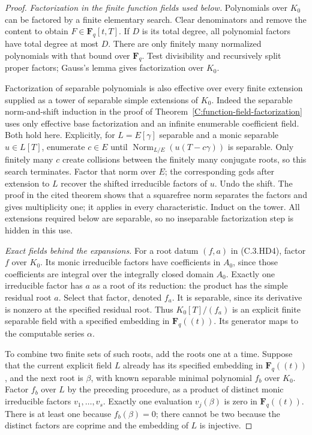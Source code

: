 \begin{proof}
\emph{Factorization in the finite function fields used below.}
Polynomials over $K_0$ can be factored by a finite
elementary search.  Clear denominators and remove the
content to obtain $F\in\mathbf F_q[t,T]$.
If $D$ is its total degree, all polynomial factors have
total degree at most $D$.  There are only finitely many
normalized polynomials with that bound over $\mathbf F_q$.
Test divisibility and recursively split proper factors;
Gauss's lemma gives factorization over $K_0$.

Factorization of separable polynomials is also effective
over every finite extension supplied as a tower of
separable simple extensions of $K_0$.
Indeed the separable norm-and-shift induction in the
proof of Theorem~\ref{C:function-field-factorization}
uses only effective base factorization and an infinite
enumerable coefficient field.  Both hold here.
Explicitly, for $L=E[\gamma]$ separable and a monic
separable $u\in L[T]$, enumerate $c\in E$ until
$\operatorname{Norm}_{L/E}(u(T-c\gamma))$ is separable.
Only finitely many $c$ create collisions between the
finitely many conjugate roots, so this search terminates.
Factor that norm over $E$; the corresponding gcds after
extension to $L$ recover the shifted irreducible factors
of $u$.  Undo the shift.  The proof in the cited theorem
shows that a squarefree norm separates the factors
and gives multiplicity one; it applies in every
characteristic.  Induct on the tower.  All extensions
required below are separable, so no inseparable
factorization step is hidden in this use.

\emph{Exact fields behind the expansions.}
For a root datum $(f,a)$ in (C.3.HD4), factor $f$ over
$K_0$.  Its monic irreducible factors have coefficients
in $A_0$, since those coefficients are integral over
the integrally closed domain $A_0$.
Exactly one irreducible factor has $a$ as a root of its
reduction: the product has the simple residual root
$a$.  Select that factor, denoted $f_a$.
It is separable, since its derivative is nonzero at
the specified residual root.  Thus
$K_0[T]/(f_a)$ is an explicit finite separable field
with a specified embedding in $\mathbf F_q((t))$.
Its generator maps to the computable series $\alpha$.

To combine two finite sets of such roots, add the
roots one at a time.  Suppose that the current
explicit field $L$ already has its specified embedding
in $\mathbf F_q((t))$, and the next root is $\beta$,
with known separable minimal polynomial $f_b$ over
$K_0$.  Factor $f_b$ over $L$ by the preceding procedure,
as a product of distinct monic irreducible factors
$v_1,\ldots,v_s$.
Exactly one evaluation $v_j(\beta)$ is zero in
$\mathbf F_q((t))$.  There is at least one because
$f_b(\beta)=0$; there cannot be two because the
distinct factors are coprime and the embedding of
$L$ is injective.


\end{proof}
